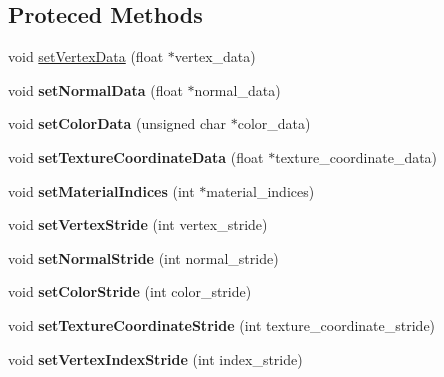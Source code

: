 \subsection*{Proteced Methods}
\begin{DoxyCompactItemize}
\item 
void \hyperlink{class_mesh_base_aa982e061ba3880ebdec15cff5310123b}{set\+Vertex\+Data} (float $\ast$vertex\+\_\+data)
\item 
\mbox{\label{class_mesh_base_ae6bd7dcaded6875a6fbc80fe09d517d3}} 
void {\bfseries set\+Normal\+Data} (float $\ast$normal\+\_\+data)
\item 
\mbox{\label{class_mesh_base_a54f3706536926f73fa7ceb48c93613ba}} 
void {\bfseries set\+Color\+Data} (unsigned char $\ast$color\+\_\+data)
\item 
\mbox{\label{class_mesh_base_a50a2d578f5ca8551a223c005d73eeb05}} 
void {\bfseries set\+Texture\+Coordinate\+Data} (float $\ast$texture\+\_\+coordinate\+\_\+data)
\item 
\mbox{\label{class_mesh_base_ac64e89644f2de5341e41b05ea161f642}} 
void {\bfseries set\+Material\+Indices} (int $\ast$material\+\_\+indices)
\item 
\mbox{\label{class_mesh_base_ab5dcf66aca578fe503a4c6bc850bd81e}} 
void {\bfseries set\+Vertex\+Stride} (int vertex\+\_\+stride)
\item 
\mbox{\label{class_mesh_base_ad7b51e2e6058a8d79ec0896136da0034}} 
void {\bfseries set\+Normal\+Stride} (int normal\+\_\+stride)
\item 
\mbox{\label{class_mesh_base_a6e93b05a9521bb14fcb68d9ce1771cfa}} 
void {\bfseries set\+Color\+Stride} (int color\+\_\+stride)
\item 
\mbox{\label{class_mesh_base_a85b5140f3641d28e2468f6547ba365c1}} 
void {\bfseries set\+Texture\+Coordinate\+Stride} (int texture\+\_\+coordinate\+\_\+stride)
\item 
\mbox{\label{class_mesh_base_a2ed368cf25b8c43ac18824c6dd980efa}} 
void {\bfseries set\+Vertex\+Index\+Stride} (int index\+\_\+stride)

\end{DoxyCompactItemize}
